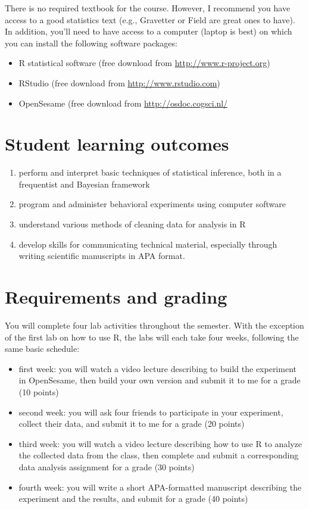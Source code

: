 \documentclass[10pt]{article}
\begin{document}
There is no required textbook for the course. However, I recommend you have access to a good statistics text (e.g., Gravetter or Field are great ones to have).  In addition, you'll need to have access to a computer (laptop is best) on which you can install the following software packages:

\begin{itemize}
\item R statistical software (free download from \href{http://www.r-project.org}{http://www.r-project.org})
\item RStudio (free download from \href{http://www.rstudio.com}{http://www.rstudio.com})
\item OpenSesame (free download from \url{http://osdoc.cogsci.nl/}
\end{itemize}

\section*{Student learning outcomes}
\label{sec:org7fb66cc}

\begin{enumerate}
\item perform and interpret basic techniques of statistical inference, both in a frequentist and Bayesian framework
\item program and administer behavioral experiments using computer software
\item understand various methods of cleaning data for analysis in R
\item develop skills for communicating technical material, especially through writing scientific manuscripts in APA format.
\end{enumerate}

\section*{Requirements and grading}
\label{sec:orgb313acb}

You will complete four lab activities throughout the semester. With the exception of the first lab on how to use R, the labs will each take four weeks, following the same basic schedule:

\begin{itemize}
\item first week: you will watch a video lecture describing to build the experiment in OpenSesame, then build your own version and submit it to me for a grade (10 points)
\item second week: you will ask four friends to participate in your experiment, collect their data, and submit it to me for a grade (20 points)
\item third week: you will watch a video lecture describing how to use R to analyze the collected data from the class, then complete and submit a corresponding data analysis assignment for a grade (30 points)
\item fourth week: you will write a short APA-formatted manuscript describing the experiment and the results, and submit for a grade (40 points)
\end{itemize}
\end{document}
